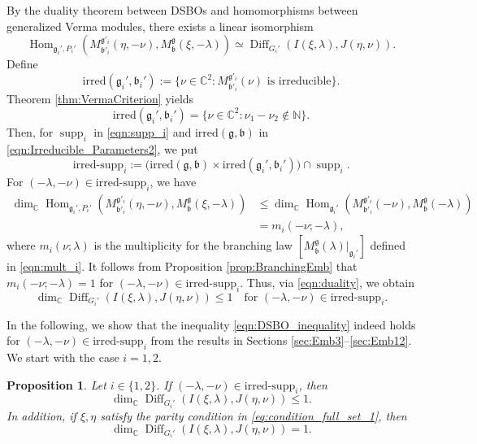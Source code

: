 \documentclass[a4paper,11pt,reqno]{amsart}
\newcommand{\frakg}{\mathfrak{g}}
\newcommand{\0}{{\bf 0}}
\newcommand{\N}{\mathbb{N}}
\newcommand{\C}{\mathbb{C}}
\newcommand{\1}{{\bf 1}}
\DeclareMathOperator{\Hom}{Hom}
\newcommand{\frakb}{{\mathfrak b}}
\newcommand{\irredsupp}{\mathrm{irred\text{-}supp}}
\newcommand{\irred}{\mathrm{irred}}
\DeclareMathOperator{\supp}{supp}
\DeclareMathOperator{\Diff}{Diff}
\newcommand{\Mb}{M^{\frakg}_{\frakb}}
\theoremstyle{plain}
\newtheorem{proposition}[equation]{Proposition}
\theoremstyle{definition}
\numberwithin{equation}{section}
\theoremstyle{definition}
\begin{document}
By the duality theorem \cite{KoPe16a} 
between DSBOs and homomorphisms between generalized 
Verma modules, there exists a linear isomorphism
\begin{equation}\label{eqn:duality}
\Hom_{\frakg_i', P_i'}
(M^{\frakg'_i}_{\frakb'_i}(\eta,-\nu), \Mb(\xi, -\lambda))
\simeq 
\Diff_{G_i'}(I(\xi, \lambda), J(\eta,\nu)).
\end{equation}
Define
\begin{equation*}
\irred(\frakg_{i}',\frakb_{i}')
:=\{\nu \in \C^2 : \text{$M^{\frakg'_i}_{\frakb'_i}(\nu)$ is irreducible}\}.
\end{equation*}
Theorem \ref{thm:VermaCriterion} yields
\begin{equation}\label{eqn:irred_prime}
\irred(\frakg_{i}',\frakb_{i}')=\{\nu \in \C^2 : \nu_1-\nu_2 \notin \N\}.
\end{equation}
Then, for $\supp_i$ in \eqref{eqn:supp_i} and $\irred(\frakg,\frakb)$ in
\eqref{eqn:Irreducible_Parameters2}, we put
\begin{equation*}
\irredsupp_i:=
\big(\irred(\frakg,\frakb)\times \irred(\frakg_{i}',\frakb_{i}')\big) \cap \supp_i.
\end{equation*}
For $(-\lambda, -\nu) \in \irredsupp_i$,
we have
\begin{align*}
\dim_\C\Hom_{\frakg_i', P_i'}
(M^{\frakg'_i}_{\frakb'_i}(\eta,-\nu), \Mb(\xi, -\lambda))
&\leq 
\dim_\C\Hom_{\frakg_i'}
(M^{\frakg'_i}_{\frakb'_i}(-\nu), \Mb(-\lambda))\\[3pt]
&=m_i(-\nu;-\lambda),
\end{align*}
where $m_i(\nu;\lambda)$ is the multiplicity for the branching law
$[\Mb(\lambda)\vert_{\frakg_i'}]$ defined in \eqref{eqn:mult_i}.
It follows from Proposition \ref{prop:BranchingEmb} that 
$m_i(-\nu;-\lambda)=1$ for $(-\lambda, -\nu) \in \irredsupp_i$.
Thus, via \eqref{eqn:duality}, we obtain
\begin{equation}\label{eqn:DSBO_inequality}
\dim_\C\Diff_{G_i'}(I(\xi, \lambda), J(\eta,\nu)) \leq 1
\quad
\text{for $(-\lambda,-\nu) \in \irredsupp_i$}.
\end{equation}

In the following, we show 
that the inequality \eqref{eqn:DSBO_inequality} indeed holds for
$(-\lambda, -\nu) \in \irredsupp_i$ from the results in Sections \ref{sec:Emb3}--\ref{sec:Emb12}.
We start with the case $i=1,2$.

\begin{proposition}
Let $i \in \{1,2\}$. 
If $(-\lambda, -\nu) \in \irredsupp_i$, then
\begin{equation*}
\dim_\C\Diff_{G_i'}(I(\xi, \lambda), J(\eta,\nu)) \leq 1.
\end{equation*}
In addition, if $\xi, \eta$ satisfy the parity condition in 
\eqref{eq:condition_full_set_1}, then
\begin{equation*}
\dim_\C\Diff_{G_i'}(I(\xi, \lambda), J(\eta,\nu)) =1.
\end{equation*}
\end{proposition}
\end{document}
